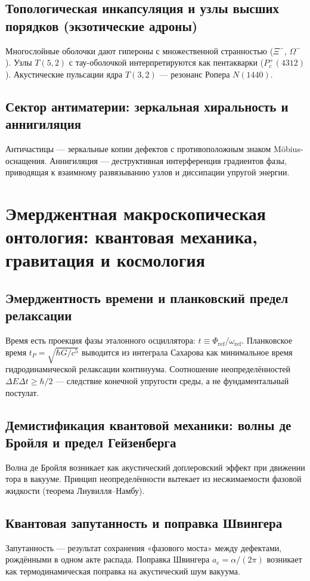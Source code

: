 \documentclass[11pt,a4paper]{article}
\begin{document}
	\subsection{Топологическая инкапсуляция и узлы высших порядков (экзотические адроны)}
	Многослойные оболочки дают гипероны с множественной странностью ($\Xi^-$, $\Omega^-$). Узлы $T(5,2)$ с тау-оболочкой интерпретируются как пентакварки ($P_c^+(4312)$). Акустические пульсации ядра $T(3,2)$ — резонанс Ропера $N(1440)$.
	
	\subsection{Сектор антиматерии: зеркальная хиральность и аннигиляция}
	Античастицы — зеркальные копии дефектов с противоположным знаком Möbius-оснащения. Аннигиляция — деструктивная интерференция градиентов фазы, приводящая к взаимному развязыванию узлов и диссипации упругой энергии.
	
	\section{Эмерджентная макроскопическая онтология: квантовая механика, гравитация и космология}
	
	\subsection{Эмерджентность времени и планковский предел релаксации}
	Время есть проекция фазы эталонного осциллятора: $t\equiv\Phi_{\text{ref}}/\omega_{\text{ref}}$. Планковское время $t_P = \sqrt{\hbar G/c^5}$ выводится из интеграла Сахарова как минимальное время гидродинамической релаксации континуума. Соотношение неопределённостей $\Delta E\Delta t\ge\hbar/2$ — следствие конечной упругости среды, а не фундаментальный постулат.
	
	\subsection{Демистификация квантовой механики: волны де Бройля и предел Гейзенберга}
	Волна де Бройля возникает как акустический доплеровский эффект при движении тора в вакууме. Принцип неопределённости вытекает из несжимаемости фазовой жидкости (теорема Лиувилля–Намбу).
	
	\subsection{Квантовая запутанность и поправка Швингера}
	Запутанность — результат сохранения «фазового моста» между дефектами, рождёнными в одном акте распада. Поправка Швингера $a_e=\alpha/(2\pi)$ возникает как термодинамическая поправка на акустический шум вакуума.
	
\end{document}

